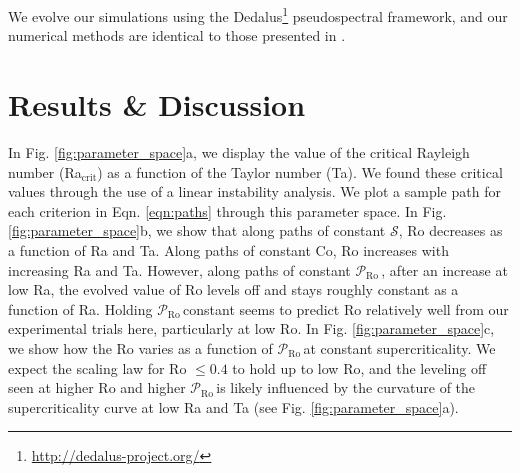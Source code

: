 \documentclass[twocolumn, amsmath, amsfonts, amssymb]{aastex62}
\newcommand{\pro}{\ensuremath{\mathcal{P}_{\text{Ro}}\,}}
\begin{document}
We evolve our simulations using the Dedalus\footnote{\url{http://dedalus-project.org/}} 
pseudospectral framework, and our numerical methods are identical to those presented
in \AB.



\section{Results \& Discussion}
\label{sec:results}
In Fig. \ref{fig:parameter_space}a, we display the value of the critical Rayleigh number 
(Ra$_{\text{crit}}$) as a function of the Taylor number (Ta). We found these critical
values through the use of a linear instability analysis. We plot a sample path for
each criterion in Eqn. \ref{eqn:paths} through
this parameter space.
In Fig. \ref{fig:parameter_space}b, we show that along paths of
constant $\mathcal{S}$, Ro 
decreases as a function of Ra and Ta. Along paths of constant Co, Ro increases
with increasing Ra and Ta. However, along paths of constant \pro, 
after an increase at low Ra, the evolved value of Ro levels off and stays roughly constant
as a function of Ra. Holding \pro constant seems to predict Ro relatively
well from our experimental trials here, particularly at low Ro. 
In Fig. \ref{fig:parameter_space}c, we
show how the Ro varies as a function of \pro at constant supercriticality.
We expect the scaling law for Ro $\leq 0.4$ to hold up to low Ro, and the
leveling off seen at higher Ro and higher \pro is likely influenced by the
curvature of the supercriticality curve at low Ra and Ta (see Fig. \ref{fig:parameter_space}a).
\end{document}

